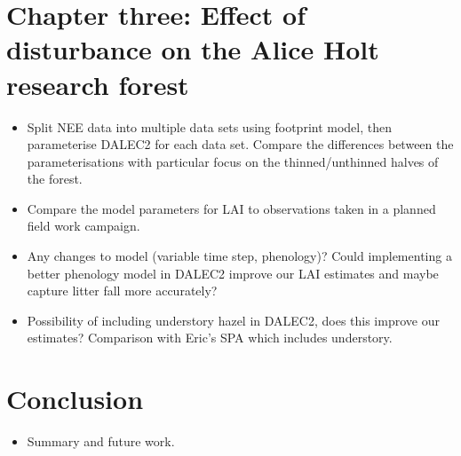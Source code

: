 \documentclass[11pt]{article}
\begin{document}
\section{Chapter three: Effect of disturbance on the Alice Holt research forest}
\begin{itemize}
\item Split NEE data into multiple data sets using footprint model, then parameterise DALEC2 for each data set. Compare the differences between the parameterisations with particular focus on the thinned/unthinned halves of the forest.
\item Compare the model parameters for LAI to observations taken in a planned field work campaign.
\item Any changes to model (variable time step, phenology)? Could implementing a better phenology model in DALEC2 improve our LAI estimates and maybe capture litter fall more accurately?
\item Possibility of including understory hazel in DALEC2, does this improve our estimates? Comparison with Eric's SPA which includes understory.
\end{itemize}


\section{Conclusion}
\begin{itemize}
\item Summary and future work.
\end{itemize}
\end{document}
